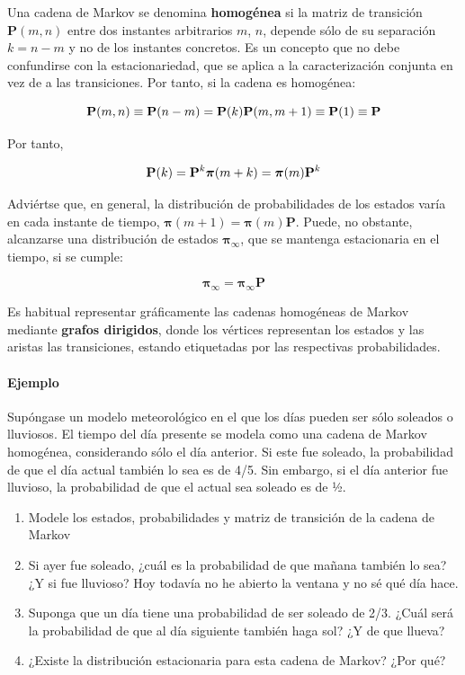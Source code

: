 \documentclass[11pt]{article}
\providecommand{\tightlist}{%
      \setlength{\itemsep}{0pt}\setlength{\parskip}{0pt}}
\begin{document}
    Una cadena de Markov se denomina \textbf{homogénea} si la matriz de
transición \(\mathbf{P}(m,n)\) entre dos instantes arbitrarios \(m\),
\(n\), depende sólo de su separación \(k = n-m\) y no de los instantes
concretos. Es un concepto que no debe confundirse con la
estacionariedad, que se aplica a la caracterización conjunta en vez de a
las transiciones. Por tanto, si la cadena es homogénea:

\[\mathbf{P}(m, n)\equiv \mathbf{P}(n-m) = \mathbf{P}(k)\\
\mathbf{P}(m, m+1)\equiv \mathbf{P}(1) \equiv \mathbf{P}\]

Por tanto,

\[
\mathbf{P}(k) = \mathbf{P}^k\\
\boldsymbol{\pi}(m+k) = \boldsymbol{\pi}(m) \mathbf{P}^k
\]

Adviértse que, en general, la distribución de probabilidades de los
estados varía en cada instante de tiempo,
\(\boldsymbol{\pi}(m+1) = \boldsymbol{\pi}(m) \mathbf{P}\). Puede, no
obstante, alcanzarse una distribución de estados
\(\boldsymbol{\pi_\infty}\), que se mantenga estacionaria en el tiempo,
si se cumple:

\[
\boldsymbol{\pi_\infty} = \boldsymbol{\pi_\infty} \mathbf{P}
\]

    Es habitual representar gráficamente las cadenas homogéneas de Markov
mediante \textbf{grafos dirigidos}, donde los vértices representan los
estados y las aristas las transiciones, estando etiquetadas por las
respectivas probabilidades.

\hypertarget{ejemplo}{%
\paragraph{Ejemplo}\label{ejemplo}}

Supóngase un modelo meteorológico en el que los días pueden ser sólo
soleados o lluviosos. El tiempo del día presente se modela como una
cadena de Markov homogénea, considerando sólo el día anterior. Si este
fue soleado, la probabilidad de que el día actual también lo sea es de
4/5. Sin embargo, si el día anterior fue lluvioso, la probabilidad de
que el actual sea soleado es de ½.

\begin{enumerate}
\def\labelenumi{\arabic{enumi}.}
\tightlist
\item
  Modele los estados, probabilidades y matriz de transición de la cadena
  de Markov
\item
  Si ayer fue soleado, ¿cuál es la probabilidad de que mañana también lo
  sea? ¿Y si fue lluvioso? Hoy todavía no he abierto la ventana y no sé
  qué día hace.
\item
  Suponga que un día tiene una probabilidad de ser soleado de 2/3. ¿Cuál
  será la probabilidad de que al día siguiente también haga sol? ¿Y de
  que llueva?
\item
  ¿Existe la distribución estacionaria para esta cadena de Markov? ¿Por
  qué?
\end{enumerate}
\end{document}
